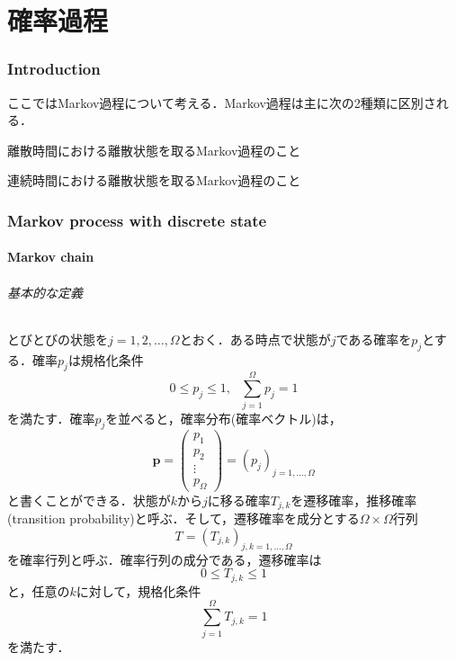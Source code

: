 \part{確率過程}
\section{Introduction}
ここではMarkov過程について考える．Markov過程は主に次の2種類に区別される．
\begin{kotak}
	\begin{definition}
	離散時間における離散状態を取るMarkov過程のこと
	\end{definition}
	\begin{definition}
	連続時間における離散状態を取るMarkov過程のこと
	\end{definition}
\end{kotak}



\section{Markov process with discrete state}

\subsection{Markov chain}
\paragraph{基本的な定義}
とびとびの状態を$j=1,2,\ldots,\Omega$とおく．ある時点で状態が$j$である確率を$p_j$とする．確率$p_j$は規格化条件
\begin{equation}
    0\leq p_j \leq1,\ \ \ \sum_{j=1}^{\Omega}p_j=1
\end{equation}
を満たす．確率$p_j$を並べると，確率分布(確率ベクトル)は，
\begin{equation}
    \bm{p} = \left(
        \begin{array}{c}
        p_1 \\
        p_2 \\
        \vdots \\
        p_\Omega
        \end{array}
        \right)
        =(p_j)_{j=1,\ldots,\Omega}
\end{equation}
と書くことができる．状態が$k$から$j$に移る確率$T_{j,k}$を遷移確率，推移確率 (transition probability)と呼ぶ．そして，遷移確率を成分とする$\Omega\times\Omega$行列
\begin{equation}
    T=(T_{j,k})_{j,k=1,\ldots,\Omega}
\end{equation}
を確率行列と呼ぶ．確率行列の成分である，遷移確率は
\begin{equation}
    0\leq T_{j,k}\leq 1
\end{equation}
と，任意の$k$に対して，規格化条件
\begin{equation}\label{normalize_condition}
    \sum_{j=1}^{\Omega}T_{j,k}=1
\end{equation}
を満たす．
